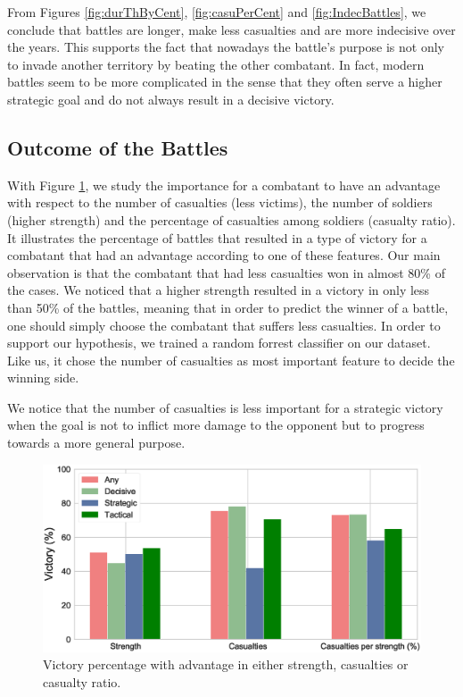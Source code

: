 From Figures \ref{fig:durThByCent}, \ref{fig:casuPerCent} and \ref{fig:IndecBattles}, we conclude that battles are longer, make less casualties and are more indecisive over the years. This supports the fact that nowadays the battle's purpose is not only to invade another territory by beating the other combatant. In fact, modern battles seem to be more complicated in the sense that they often serve a higher strategic goal and do not always result in a decisive victory.

\subsection{Outcome of the Battles}

With Figure \ref{fig:victoryAdvantage}, we study the importance for a combatant to have an advantage with respect to the number of casualties (less victims), the number of soldiers (higher strength) and the percentage of casualties among soldiers (casualty ratio). It illustrates the percentage of battles that resulted in a type of victory for a combatant that had an advantage according to one of these features. Our main observation is that the combatant that had less casualties won in almost 80\% of the cases. We noticed that a higher strength resulted in a victory in only less than 50\% of the battles, meaning that in order to predict the winner of a battle, one should simply choose the combatant that suffers less casualties. In order to support our hypothesis, we trained a random forrest classifier on our dataset. Like us, it chose the number of casualties as most important feature to decide the winning side.

We notice that the number of casualties is less important for a strategic victory when the goal is not to inflict more damage to the opponent but to progress towards a more general purpose.
 \begin{figure}[h]
	\centering	\includegraphics[width=\linewidth]{figures/VictoryAdvantage}
	\caption{Victory percentage with advantage in either strength, casualties or casualty ratio.}\label{fig:victoryAdvantage}
	\centering
\end{figure}

